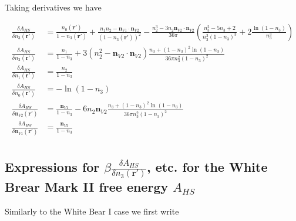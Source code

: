 \documentclass[letterpaper,twocolumn,amsmath,amssymb,jcp,10pt,aip]{revtex4-1}
\begin{document}
\begin{widetext}
Taking derivatives we have

  \begin{align}
    \frac{\delta A_{HS}}{\delta n_3(\mathbf{r}')} &=
    \frac{n_0(\mathbf{r}')}{1 - n_3(\mathbf{r}')}
    + \frac{n_1n_2 - \mathbf{n}_{V1}\cdot\mathbf{n}_{V2}}{(1 -
      n_3(\mathbf{r}'))^2}
    - \frac{n_2^3 -
      3n_2\mathbf{n}_{V2}\cdot\mathbf{n}_{V2}}{36\pi}\left(
    \frac{n_3^2-5n_3+2}{n_3^3(1-n_3)^3} + 2\frac{\ln(1-n_3)}{n_3^3}
    \right)
    \\
    \frac{\delta A_{HS}}{\delta n_2(\mathbf{r}')} &=
    \frac{n_1}{1-n_3}
    + 3(n_2^2 - \mathbf{n}_{V2}\cdot\mathbf{n}_{V2})\frac{n_3 +
      (1-n_3)^2\ln(1-n_3)}{
      36\pi n_3^2(1-n_3)^2
    }
    \\
    \frac{\delta A_{HS}}{\delta n_1(\mathbf{r}')} &= \frac{n_2}{1-n_3}
    \\
    \frac{\delta A_{HS}}{\delta n_0(\mathbf{r}')} &=
    -\ln\left( 1 - n_3\right) \\
    \frac{\delta A_{HS}}{\delta \mathbf{n}_{V2}(\mathbf{r}')} &=
    \frac{\mathbf{n}_{V1}}{1-n_3}
    - 6 n_2 \mathbf{n}_{V2} \frac{n_3 +
      (1-n_3)^2\ln(1-n_3)}{
      36\pi n_3^2(1-n_3)^2
    }    \\
    \frac{\delta A_{HS}}{\delta \mathbf{n}_{V1}(\mathbf{r}')} &=
    \frac{\mathbf{n}_{V2}}{1-n_3} \\
  \end{align}


\subsection{Expressions for $\beta\frac{\delta A_{HS}}{\delta n_3(\mathbf{r}')}$, etc. for the White Brear Mark II free energy $A_{HS}$}

Similarly to the White Bear I case we first write


\end{widetext}
\end{document}
